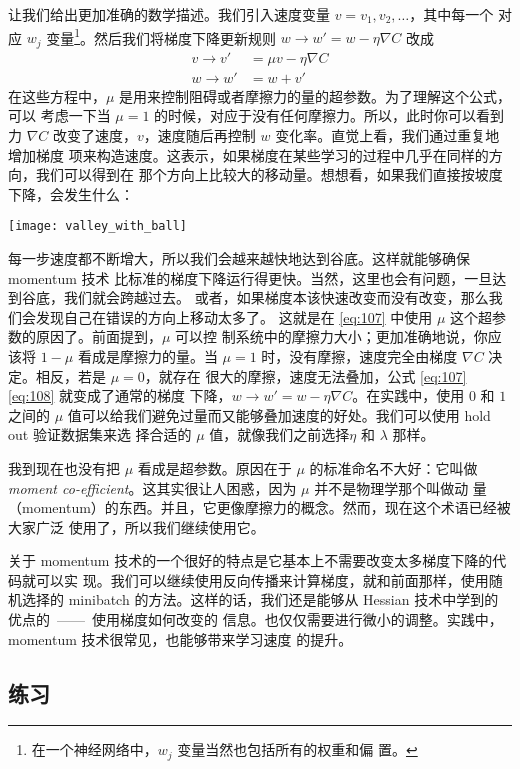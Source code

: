 让我们给出更加准确的数学描述。我们引入速度变量 $v = v_1, v_2, \ldots$，其中每一个
对应 $w_j$ 变量\footnote{在一个神经网络中，$w_j$ 变量当然也包括所有的权重和偏
  置。}。然后我们将梯度下降更新规则 $w\rightarrow w'=w-\eta\nabla C$ 改成
\begin{align} 
  v \rightarrow v' &= \mu v - \eta \nabla C \label{eq:107}\tag{107}\\
  w \rightarrow w' &= w+v' \label{eq:108}\tag{108}
\end{align}
在这些方程中，$\mu$ 是用来控制阻碍或者摩擦力的量的超参数。为了理解这个公式，可以
考虑一下当 $\mu=1$ 的时候，对应于没有任何摩擦力。所以，此时你可以看到力 $\nabla
C$ 改变了速度，$v$，速度随后再控制 $w$ 变化率。直觉上看，我们通过重复地增加梯度
项来构造速度。这表示，如果梯度在某些学习的过程中几乎在同样的方向，我们可以得到在
那个方向上比较大的移动量。想想看，如果我们直接按坡度下降，会发生什么：
\begin{center}
  \texttt{[image: valley\_with\_ball]}
\end{center}

每一步速度都不断增大，所以我们会越来越快地达到谷底。这样就能够确保 momentum 技术
比标准的梯度下降运行得更快。当然，这里也会有问题，一旦达到谷底，我们就会跨越过去。
或者，如果梯度本该快速改变而没有改变，那么我们会发现自己在错误的方向上移动太多了。
这就是在 \eqref{eq:107} 中使用 $\mu$ 这个超参数的原因了。前面提到，$\mu$ 可以控
制系统中的摩擦力大小；更加准确地说，你应该将 $1-\mu$ 看成是摩擦力的量。当
$\mu=1$ 时，没有摩擦，速度完全由梯度 $\nabla C$ 决定。相反，若是 $\mu=0$，就存在
很大的摩擦，速度无法叠加，公式 \eqref{eq:107} \eqref{eq:108} 就变成了通常的梯度
下降，$w\rightarrow w'=w-\eta \nabla C$。在实践中，使用 $0$ 和 $1$ 之间的 $\mu$
值可以给我们避免过量而又能够叠加速度的好处。我们可以使用 hold out 验证数据集来选
择合适的 $\mu$ 值，就像我们之前选择$\eta$ 和 $\lambda$ 那样。

我到现在也没有把 $\mu$ 看成是超参数。原因在于 $\mu$ 的标准命名不大好：它叫做
\emph{moment co-efficient}。这其实很让人困惑，因为 $\mu$ 并不是物理学那个叫做动
量（momentum）的东西。并且，它更像摩擦力的概念。然而，现在这个术语已经被大家广泛
使用了，所以我们继续使用它。

关于 momentum 技术的一个很好的特点是它基本上不需要改变太多梯度下降的代码就可以实
现。我们可以继续使用反向传播来计算梯度，就和前面那样，使用随机选择的 minibatch
的方法。这样的话，我们还是能够从 Hessian 技术中学到的优点的~——~使用梯度如何改变的
信息。也仅仅需要进行微小的调整。实践中，momentum 技术很常见，也能够带来学习速度
的提升。

\subsection*{练习}

